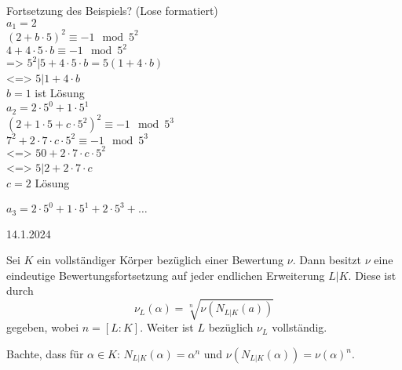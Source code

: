 \documentclass[../main.tex]{subfiles}
\begin{document}
Fortsetzung des Beispiels? (Lose formatiert)\\
$a_1=2$ \\
$(2+b\cdot 5)^2\equiv -1 \mod 5^2$\\
$4+4\cdot 5\cdot b \equiv -1 \mod 5^2$\\
=> $5^2| 5+4\cdot 5\cdot b = 5(1+4\cdot b)$\\
<=> $5| 1+4\cdot b$\\
$b=1$ ist Lösung\\

$a_2 = 2 \cdot 5^0+1\cdot 5^1$\\
$(2+1\cdot 5 + c\cdot 5^2)^2\equiv-1 \mod 5^3$\\
$7^2+2\cdot 7\cdot c \cdot 5^2\equiv -1\mod 5^3$\\
<=> $50+2\cdot 7 \cdot c \cdot 5^2$\\
<=>
$5| 2+2\cdot 7\cdot c$\\
$c = 2$ Lösung


$a_3 = 2\cdot 5^0+ 1\cdot 5^1 + 2\cdot 5^3+\dots$

\begin{flushright}
    14.1.2024
\end{flushright}


\begin{theorem}
    Sei $K$ ein vollständiger Körper bezüglich einer Bewertung $\nu$.
    Dann besitzt $\nu$ eine eindeutige Bewertungsfortsetzung auf jeder endlichen Erweiterung $L|K$.
    Diese ist durch $$\nu_L(\alpha) = \sqrt[n]{\nu\left(N_{L|K}(a)\right)}$$ gegeben, wobei $n=[L:K]$. Weiter ist $L$ bezüglich $\nu_L$ vollständig.
\end{theorem}
Bachte, dass für $\alpha\in K$:
$N_{L|K}(\alpha) = \alpha^n $ und
$\nu(N_{L|K}(\alpha)) = \nu(\alpha)^n$.
\end{document}
